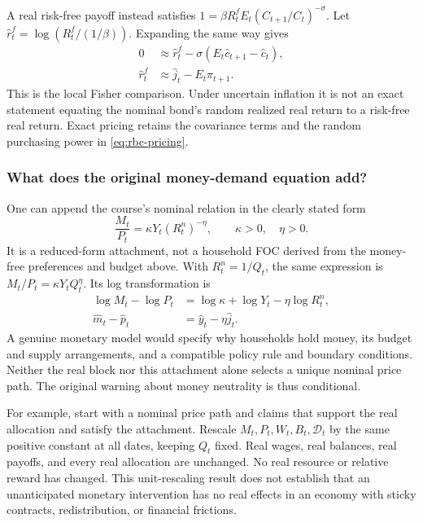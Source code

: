 A real risk-free payoff instead satisfies
$1=\beta R_t^fE_t(C_{t+1}/C_t)^{-\sigma}$. Let
$\hat r_t^f=\log(R_t^f/(1/\beta))$. Expanding the same way gives
\begin{align}
0&\approx\hat r_t^f-\sigma(E_t\hat c_{t+1}-\hat c_t),\\
\hat r_t^f&\approx\hat j_t-E_t\pi_{t+1}.
\end{align}
This is the local Fisher comparison. Under uncertain inflation it is not an
exact statement equating the nominal bond's random realized real return to
a risk-free real return. Exact pricing retains the covariance terms and the
random purchasing power in \eqref{eq:rbc-pricing}.

\subsubsection{What does the original money-demand equation add?}

One can append the course's nominal relation in the clearly stated form
\begin{equation}
\frac{M_t}{P_t}=\kappa Y_t(R_t^n)^{-\eta},\qquad\kappa>0,\quad\eta>0.
\end{equation}
It is a reduced-form attachment, not a household FOC derived from the
money-free preferences and budget above. With $R_t^n=1/Q_t$, the same expression
is $M_t/P_t=\kappa Y_tQ_t^\eta$. Its log transformation is
\begin{align}
\log M_t-\log P_t&=\log\kappa+\log Y_t-\eta\log R_t^n,\\
\hat m_t-\hat p_t&=\hat y_t-\eta\hat j_t.
\end{align}
A genuine monetary model would specify why households hold money, its budget
and supply arrangements, and a compatible policy rule and boundary conditions.
Neither the real block nor this attachment alone selects a unique nominal
price path. The original warning about money neutrality is thus conditional.

For example, start with a nominal price path and claims that support the real
allocation and satisfy the attachment. Rescale $M_t,P_t,W_t,B_t,\mathcal D_t$
by the same positive constant at all dates, keeping $Q_t$ fixed. Real wages,
real balances, real payoffs, and every real allocation are unchanged. No real
resource or relative reward has changed. This unit-rescaling result does not
establish that an unanticipated monetary intervention has no real effects in
an economy with sticky contracts, redistribution, or financial frictions.

